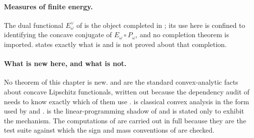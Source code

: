 \paragraph{Measures of finite energy.}
The dual functional \(E^\vee_\omega\) of
 is the object completed in
\cite{BJ25FiniteEnergy}; its use here is confined to identifying the
concave conjugate of \(E_\omega\circ P_\omega\), and no completion theorem
is imported.   states exactly what is
and is not proved about that completion.

\paragraph{What is new here, and what is not.}
No theorem of this chapter is new.
 and
 are the standard convex-analytic
facts about concave Lipschitz functionals, written out because the
dependency audit of  needs to know exactly
which of them use .
 is classical convex analysis in the
form used by \cite{BGPS14} and \cite{BGJKK25}.
 is the linear-programming shadow of
 and is stated only to
exhibit the mechanism.  The computations of  are
carried out in full because they are the test suite against which the sign
and mass conventions of  are checked.
